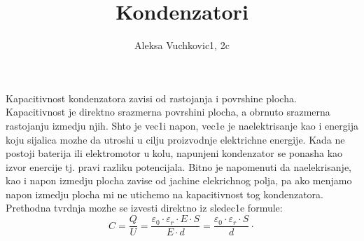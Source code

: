 \documentclass[11pt]{article}
\title{\bf{Kondenzatori}}
\author{\Large Aleksa Vuchkovic1, 2c}
\date{}
\begin{document}
\maketitle
\Large\noindent
Kapacitivnost kondenzatora zavisi od rastojanja i povrshine plocha. Kapacitivnost je direktno srazmerna povrshini plocha, a obrnuto srazmerna rastojanju izmedju njih. Shto je vec1i napon, vec1e je naelektrisanje kao i energija koju sijalica mozhe da utroshi u cilju proizvodnje elektrichne energije. Kada ne postoji baterija ili elektromotor u kolu, napunjeni kondenzator se ponasha kao izvor enercije tj. pravi razliku potencijala. Bitno je napomenuti da naelekrisanje, kao i napon izmedju plocha zavise od jachine elekrichnog polja, pa ako \text menjamo napon izmedju plocha mi ne utichemo na kapacitivnost tog kondenzatora. Prethodna tvrdnja mozhe se izvesti direktno iz sledec1e formule:
$$C=\frac{Q}{U}=\frac{\varepsilon_0\cdot\varepsilon_r\cdot E\cdot S}{E\cdot d}=\frac{\varepsilon_0\cdot\varepsilon_r\cdot S}{d}\cdot$$
\end{document}
